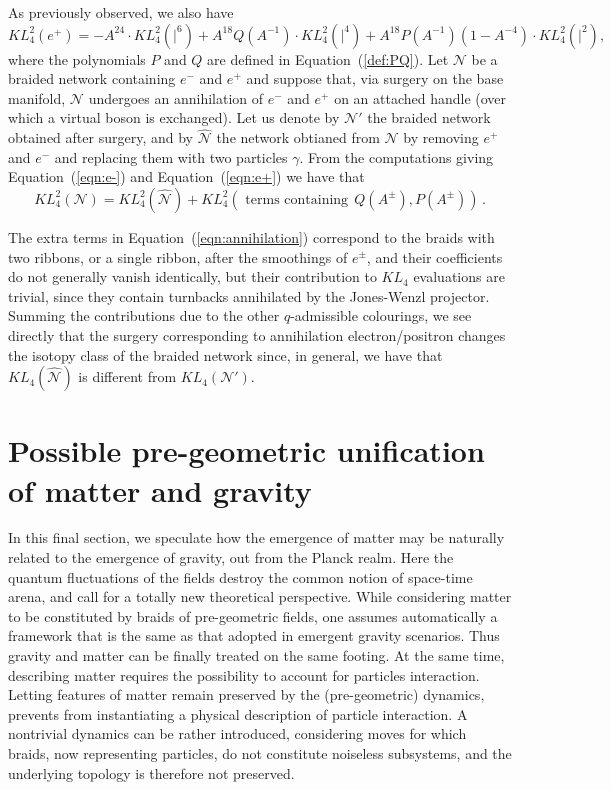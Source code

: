 \documentclass[aps,nofootinbib,amsfonts,superscriptaddress]{revtex4}
\begin{document}
  As previously observed, we also have 
 \begin{equation}\label{eqn:e+}
  KL^2_4(e^+) = -A^{24}\cdot KL^2_4(|^6) + A^{18}Q(A^{-1})\cdot KL^2_4(|^4) + A^{18}P(A^{-1})(1-A^{-4})\cdot KL^2_4(|^2),  
 \end{equation}
 where the polynomials $P$ and $Q$ are defined in Equation~(\ref{def:PQ}).
  Let $\mathcal N$ be a braided network containing $e^-$ and $e^+$ and suppose that, via surgery on the base manifold, $\mathcal N$ undergoes an annihilation of $e^-$ and $e^+$ on an attached handle (over which a virtual boson is exchanged). Let us denote by $\mathcal N'$ the braided network obtained after surgery, and by $\hat{\mathcal N}$ the network obtianed from $\mathcal N$ by removing $e^+$ and $e^-$ and replacing them with two particles $\gamma$. From the computations giving Equation~(\ref{eqn:e-}) and Equation~(\ref{eqn:e+}) we have that 
\begin{equation}\label{eqn:annihilation}
 KL^2_4(\mathcal N) = KL^2_4(\hat{\mathcal N}) + KL^2_4(\text{ terms\ containing}\ \ Q(A^\pm), P(A^\pm))\,.   
\end{equation}
 
 The extra terms in Equation~(\ref{eqn:annihilation}) correspond to the braids with two ribbons, or a single ribbon, after the smoothings of $e^\pm$, and their coefficients do not generally vanish identically, but their contribution to $KL_4$ evaluations are trivial, since they contain turnbacks annihilated by the Jones-Wenzl projector. Summing the contributions due to the other $q$-admissible colourings, we see directly that the surgery corresponding to annihilation electron/positron changes the isotopy class of the braided network since, in general, we have that $KL_4(\hat{\mathcal N})$ is different from $KL_4(\mathcal N')$. 
 
\section{Possible pre-geometric unification of matter and gravity}
\label{Sec:Pre-geometry}
In this final section, we speculate how the emergence of matter may be naturally related to the emergence of gravity, out from the Planck realm. Here the quantum fluctuations of the fields destroy the common notion of space-time arena, and call for a totally new theoretical perspective. While considering matter to be constituted by braids of pre-geometric fields, one assumes automatically a framework that is the same as that adopted in emergent gravity scenarios. Thus gravity and matter can be finally treated on the same footing. At the same time, describing matter requires the possibility to account for particles interaction. Letting features of matter remain preserved by the (pre-geometric) dynamics, prevents from instantiating a physical description of particle interaction. A nontrivial dynamics can be rather introduced, considering moves for which braids, now representing particles, do not constitute noiseless subsystems, and the underlying topology is therefore not preserved. \\
\end{document}
